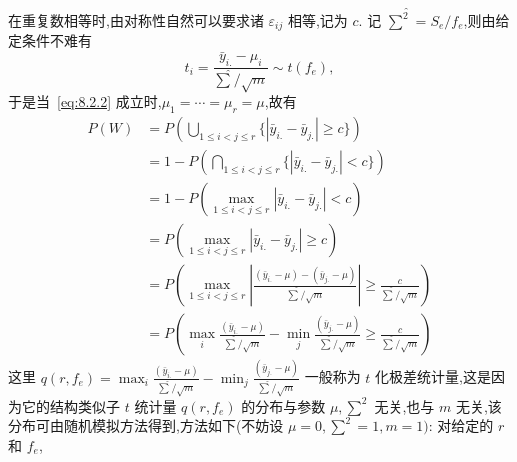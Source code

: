 在重复数相等时,由对称性自然可以要求诸 $\varepsilon_{ij}$ 相等,记为 $c$. 记 $\hat{\sum^2} = S_e/f_e$,则由给定条件不难有
\begin{equation*}
  t_i = \frac{\bar{y}_{i.} - \mu_i}{\hat{\sum}/\sqrt{m}} \sim t(f_e),
\end{equation*}
于是当~\eqref{eq:8.2.2} 成立时,$\mu_1 = \cdots = \mu_r = \mu$,故有
\begin{align*}
  P(W)  & = P\left(\bigcup_{1\leq i < j \leq r} \{|\bar{y}_{i.} - \bar{y}_{j.}| \geq c\}\right)\\
        & = 1- P\left(\bigcap_{1\leq i < j \leq r} \{|\bar{y}_{i.} - \bar{y}_{j.}| < c\}\right)\\
        & = 1 - P(\max_{1\leq i < j \leq r} |\bar{y}_{i.} - \bar{y}_{j.}| < c) \\
        & = P(\max_{1\leq i < j \leq r} |\bar{y}_{i.} - \bar{y}_{j.}| \geq c) \\
        & = P\left(\max_{1 \leq i < j \leq r} \left|\frac{(\bar{y}_{i.}-\mu) - (\bar{y}_{j.}-\mu)}{\hat{\sum}/\sqrt{m}}\right|\geq \frac{c}{\hat{\sum}/\sqrt{m}}\right)\\
        & = P\left(\max_{i} \frac{(\bar{y}_{i.}-\mu)}{\hat{\sum}/\sqrt{m}} - \min_{j}\frac{(\bar{y}_{j.}-\mu)}{\hat{\sum}/\sqrt{m}}\geq \frac{c}{\hat{\sum}/\sqrt{m}}\right)
\end{align*}
这里 $q(r,f_e)=\max_{i} \frac{(\bar{y}_{i.}-\mu)}{\hat{\sum}/\sqrt{m}} - \min_{j} \frac{(\bar{y}_{j.}-\mu)}{\hat{\sum}/\sqrt{m}}$ 一般称为 $t$ 化极差统计量,这是因为它的结构类似子 $t$ 统计量 $q(r,f_e)$ 的分布与参数 $\mu, \sum^2$ 无关,也与 $m$ 无关,该分布可由随机模拟方法得到,方法如下(不妨设 $\mu=0, \sum^2=1, m=1)$: 对给定的 $r$ 和 $f_e$,
